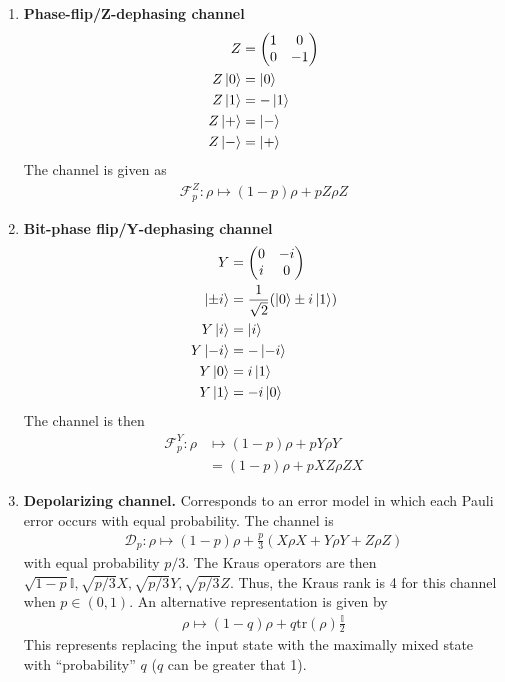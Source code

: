 \documentclass[../../note.tex]{subfiles}
\begin{document}
\begin{enumerate}
    \item\textbf{ Phase-flip/Z-dephasing channel} 
    \begin{align}
        Z&= \begin{pmatrix}
        1 & 0 \\
        0 & -1
        \end{pmatrix}\\
        Z \ket{0} &= \ket{0}\\
        Z \ket{1} &= -\ket{1} \\
        Z \ket{+} &= \ket{-} \\
        Z \ket{-} &= \ket{+}
    \end{align}
    The channel is given as
    \begin{align}
        \mathcal{F}_{p}^Z: \rho \mapsto (1-p) \rho + p Z\rho Z
    \end{align}
    \item \textbf{Bit-phase flip/Y-dephasing channel}
    \begin{align}
    Y&=\begin{pmatrix}
        0 & -i \\
        i & 0
        \end{pmatrix}\\
        \ket{\pm i} &=\frac{1}{\sqrt{2}}(\ket{0}\pm i\ket{1})\\
        Y \ket{i} &= \ket{i}\\
        Y \ket{-i} &= -\ket{-i} \\
        Y \ket{0} &= i\ket{1} \\
        Y \ket{1} &= -i\ket{0}
    \end{align}
    The channel is then
    \begin{align}
        \mathcal{F}_{p}^Y: \rho &\mapsto (1-p)\rho +p Y\rho Y \\
        &= (1-p)\rho +p XZ\rho ZX 
    \end{align}
    
    \item \textbf{Depolarizing channel.} Corresponds to an error model in which each Pauli error occurs with equal probability. The channel is
    \begin{align}
        \mathcal{D}_p: \rho \mapsto (1-p)\rho + \frac{p}{3}\left(X\rho X + Y\rho Y + Z\rho Z\right)
    \end{align}
    with equal probability $p/3$. The Kraus operators are then $\sqrt{1-p} \mathbb{I}, \sqrt{p/3} X, \sqrt{p/3} Y, \sqrt{p/3}Z$. Thus, the Kraus rank is 4 for this channel when $p\in (0,1)$. An alternative representation is given by 
    \begin{align}
        \rho \mapsto (1-q)\rho + q \text{tr}(\rho) \frac{\mathbb{I}}{2}
    \end{align}
    This represents replacing the input state with the maximally mixed state with ``probability'' $q$ ($q$ can be greater that 1).


\end{enumerate}
\end{document}
